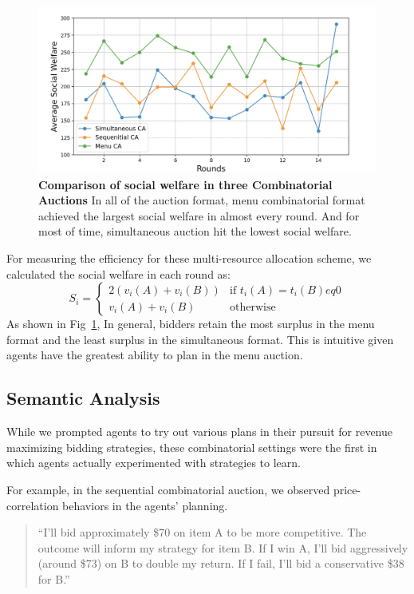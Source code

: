 \documentclass{article} %
\begin{document}
\begin{figure}[h]
    \centering \includegraphics[width=0.9\linewidth]{Figs/social_welfare.png}
    \caption{\textbf{Comparison of social welfare in three Combinatorial Auctions} In all of the auction format, menu combinatorial format achieved the largest social welfare in almost every round. 
    And for most of time, simultaneous auction hit the lowest social welfare.}
    \label{fig:social}
\end{figure}

For measuring the efficiency for these multi-resource allocation scheme, we calculated the social welfare in each round as:
\begin{equation}
   S_i = 
   \begin{cases}
      2 \left( v_i(A) + v_i(B) \right) & \text{if } t_i(A) = t_i(B) eq 0\\
      v_i(A) + v_i(B) & \text{otherwise}
   \end{cases}
\end{equation}
As shown in Fig~\ref{fig:social}, In general, bidders retain the most surplus in the menu format and the least surplus in the simultaneous format. 
This is intuitive given agents have the greatest ability to plan in the menu auction.


\subsection{Semantic Analysis}
While we prompted agents to try out various plans in their pursuit for revenue maximizing bidding strategies, these combinatorial settings were the first in which agents actually experimented with strategies to learn. 

For example, in the sequential combinatorial auction, we observed price-correlation behaviors in the agents' planning.
\begin{quote}
    ``I'll bid approximately \$70 on item A to be more competitive. The outcome will inform my strategy for item B. If I win A, I'll bid aggressively (around \$73) on B to double my return. If I fail, I'll bid a conservative \$38 for B.''
\end{quote}
\end{document}
